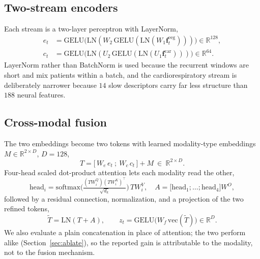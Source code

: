 \documentclass[journal]{IEEEtran}
\begin{document}
\subsection{Two-stream encoders}
Each stream is a two-layer perceptron with LayerNorm,
\begin{align}
e_t&=\mathrm{GELU}\!\big(\mathrm{LN}(W_2\,\mathrm{GELU}(\mathrm{LN}(W_1\mathbf{f}^{\mathrm{eeg}}_t))) \big)\in\mathbb{R}^{128},\\
c_t&=\mathrm{GELU}\!\big(\mathrm{LN}(U_2\,\mathrm{GELU}(\mathrm{LN}(U_1\mathbf{f}^{\mathrm{car}}_t))) \big)\in\mathbb{R}^{64}.
\end{align}
LayerNorm rather than BatchNorm is used because the recurrent windows are short and mix
patients within a batch, and the cardiorespiratory stream is deliberately narrower because
$14$ slow descriptors carry far less structure than $188$ neural features.

\subsection{Cross-modal fusion}
The two embeddings become two tokens with learned modality-type embeddings
$M\in\mathbb{R}^{2\times D}$, $D=128$,
\begin{equation}
T=\big[\,W_e\,e_t\ ;\ W_c\,c_t\,\big]+M\ \in\ \mathbb{R}^{2\times D}.
\end{equation}
Four-head scaled dot-product attention lets each modality read the other,
\begin{equation}
\mathrm{head}_i=\mathrm{softmax}\!\Big(\tfrac{(TW^Q_i)(TW^K_i)^{\!\top}}{\sqrt{d_k}}\Big)\,TW^V_i,
\quad A=\big[\mathrm{head}_1;\dots;\mathrm{head}_4\big]W^O,
\end{equation}
followed by a residual connection, normalization, and a projection of the two refined tokens,
\begin{equation}
\tilde T=\mathrm{LN}(T+A),\qquad z_t=\mathrm{GELU}\!\big(W_f\,\mathrm{vec}(\tilde T)\big)\in\mathbb{R}^{D}.
\end{equation}
We also evaluate a plain concatenation in place of attention; the two perform alike
(Section~\ref{sec:ablate}), so the reported gain is attributable to the modality, not to the
fusion mechanism.
\end{document}
